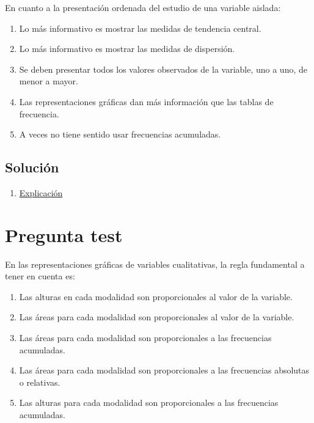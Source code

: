 \documentclass[
]{book}
\providecommand{\tightlist}{%
  \setlength{\itemsep}{0pt}\setlength{\parskip}{0pt}}
\begin{document}
En cuanto a la presentación ordenada del estudio de una variable aislada:

\begin{enumerate}
\def\labelenumi{\alph{enumi})}
\tightlist
\item
  Lo más informativo es mostrar las medidas de tendencia central.
\item
  Lo más informativo es mostrar las medidas de dispersión.
\item
  Se deben presentar todos los valores observados de la variable, uno a uno, de menor a mayor.
\item
  Las representaciones gráficas dan más información que las tablas de frecuencia.
\item
  A veces no tiene sentido usar frecuencias acumuladas.
\end{enumerate}

\hypertarget{soluciuxf3n-22}{%
\subsection{Solución}\label{soluciuxf3n-22}}

\begin{enumerate}
\def\labelenumi{\alph{enumi})}
\setcounter{enumi}{4}
\tightlist
\item
  \href{https://1fjmanzano.github.io/bioestadistica/otros-gra\%CC\%81ficos.html}{Explicación}
\end{enumerate}

\hypertarget{pregunta-test-20}{%
\section{Pregunta test}\label{pregunta-test-20}}

En las representaciones gráficas de variables cualitativas, la regla fundamental a tener en cuenta es:

\begin{enumerate}
\def\labelenumi{\alph{enumi})}
\tightlist
\item
  Las alturas en cada modalidad son proporcionales al valor de la variable.
\item
  Las áreas para cada modalidad son proporcionales al valor de la variable.
\item
  Las áreas para cada modalidad son proporcionales a las frecuencias acumuladas.
\item
  Las áreas para cada modalidad son proporcionales a las frecuencias absolutas o relativas.
\item
  Las alturas para cada modalidad son proporcionales a las frecuencias acumuladas.
\end{enumerate}
\end{document}
